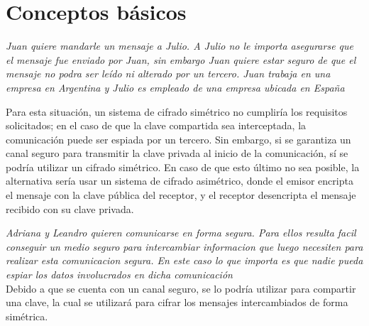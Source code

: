 







\clearpage
\tableofcontents
\clearpage 

\lstset{style=bashstyle}

\section{Conceptos básicos}

\emph{Juan quiere mandarle un mensaje a Julio. A Julio no le importa asegurarse que el mensaje fue enviado por Juan, sin embargo Juan quiere estar seguro de que el mensaje no podra ser leído ni alterado por un tercero. Juan trabaja en una empresa en Argentina y Julio es empleado de una empresa ubicada en España} 

Para esta situación, un sistema de cifrado simétrico no cumpliría los requisitos solicitados; en el caso de que la clave compartida sea interceptada, la comunicación puede ser espiada por un tercero. Sin embargo, si se garantiza un canal seguro para transmitir la clave privada al inicio de la comunicación, sí se podría utilizar un cifrado simétrico. En caso de que esto último no sea posible, la alternativa sería usar un sistema de cifrado asimétrico, donde el emisor encripta el mensaje con la clave pública del receptor, y el receptor desencripta el mensaje recibido con su clave privada.

\vspace*{5mm}
\emph{Adriana y Leandro quieren comunicarse en forma segura. Para ellos resulta facil conseguir un medio seguro para intercambiar informacion que luego necesiten para realizar esta comunicacion segura. En este caso lo que importa es que nadie pueda espiar los datos involucrados en dicha comunicación} 
~\\

Debido a que se cuenta con un canal seguro, se lo podría utilizar para compartir una clave, la cual se utilizará para cifrar los mensajes intercambiados de forma simétrica.


